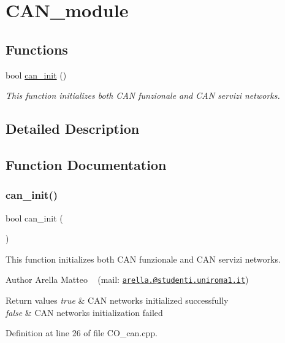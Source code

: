 \hypertarget{group___c_a_n__module}{}\section{C\+A\+N\+\_\+module}
\label{group___c_a_n__module}
\subsection*{Functions}
\begin{DoxyCompactItemize}
\item 
bool \mbox{\hyperlink{group___c_a_n__module_ga36b6b5924eb84ef2e4c2bd548b28436f}{can\+\_\+init}} ()
\begin{DoxyCompactList}\small\item\em This function initializes both C\+AN funzionale and C\+AN servizi networks. \end{DoxyCompactList}\end{DoxyCompactItemize}


\subsection{Detailed Description}


\subsection{Function Documentation}
\mbox{\label{group___c_a_n__module_ga36b6b5924eb84ef2e4c2bd548b28436f}} 
\subsubsection{\texorpdfstring{can\+\_\+init()}{can\_init()}}
{\footnotesize\ttfamily bool can\+\_\+init (\begin{DoxyParamCaption}{ }\end{DoxyParamCaption})}



This function initializes both C\+AN funzionale and C\+AN servizi networks. 

\begin{DoxyAuthor}{Author}
Arella Matteo ~\newline
 (mail\+: \href{mailto:arella.1646983@studenti.uniroma1.it}{\tt arella.@studenti.\+uniroma1.\+it}) 
\end{DoxyAuthor}

\begin{DoxyRetVals}{Return values}
{\em true} & C\+AN networks initialized successfully \\
\hline
{\em false} & C\+AN networks initialization failed \\
\hline
\end{DoxyRetVals}


Definition at line 26 of file C\+O\+\_\+can.\+cpp.

